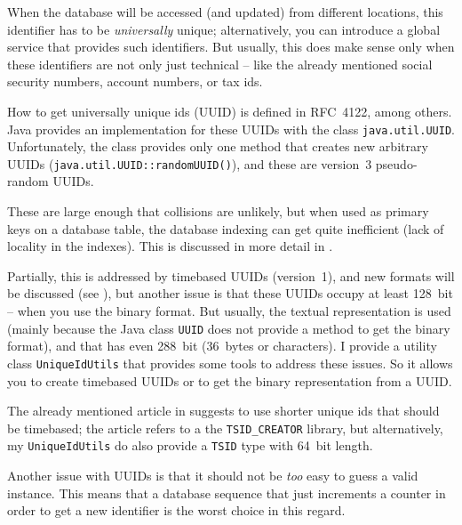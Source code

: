 \documentclass[11pt,a4paper, titlepage, parskip=half, headsepline, footsepline, cleardoublepage=current, headheight=1cm]{scrbook}
\begin{document}
When the database will be accessed (and updated) from different locations, this identifier has to be \textit{universally} unique; alternatively, you can introduce a global service that provides such identifiers. But usually, this does make sense only when these identifiers are not only just technical – like the already mentioned social security numbers, account numbers, or tax ids.

How to get universally unique ids (UUID) is defined in RFC~4122\autocite{Leach:RFC4122}, among others. Java provides an implementation for these UUIDs with the class \lstinline|java.util.UUID|\autocite{ORACLE_DOC_UUID_CLASS}. Unfortunately, the class provides only one method that creates new arbitrary UUIDs (\lstinline|java.util.UUID::randomUUID()|\autocite{ORACLE_DOC_UUID:randomUUID}), and these are version~3 pseudo-random UUIDs.

These are large enough that collisions are unlikely, but when used as primary keys on a database table, the database indexing can get quite inefficient (lack of locality in the indexes). This is discussed in more detail in \autocite{Mihalcea:UUID_Database_Primary_Key}.

Partially, this is addressed by timebased UUIDs (version~1), and new formats will be discussed (see \autocite{Davis:NewUUIDs, Leach:RFC4122bis}), but another issue is that these UUIDs occupy at least 128~bit – when you use the binary format. But usually, the textual representation is used (mainly because the Java class \lstinline|UUID| does not provide a method to get the binary format), and that has even 288~bit (36~bytes or characters). I provide a utility class \lstinline|UniqueIdUtils|\autocite{TQUADRAT_ORG_FOUNDATION_UNIQUEIDUTILS} that provides some tools to address these issues. So it allows you to create timebased UUIDs or to get the binary representation from a UUID.

The already mentioned article in \autocite{Mihalcea:UUID_Database_Primary_Key} suggests to use shorter unique ids that should be timebased; the article refers to a the \verb#TSID_CREATOR# library\autocite{Lima:TSID_CREATOR}, but alternatively, my \lstinline|UniqueIdUtils| do also provide a \lstinline|TSID| type with 64~bit length.

Another issue with UUIDs is that it should not be \textit{too} easy to guess a valid instance. This means that a database sequence\autocite{TOAD_WORLD_BLOG:DatabaseSequence} that just increments a counter in order to get a new identifier is the worst choice in this regard.
\end{document}
